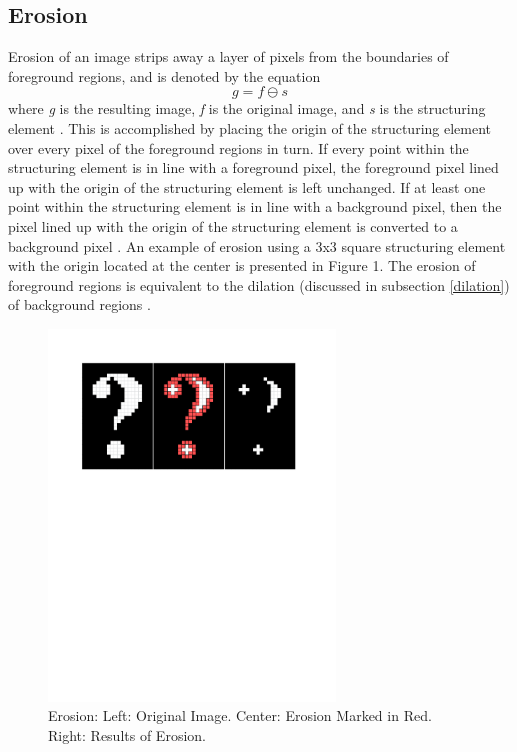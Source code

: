 \documentclass{sig-alternate}
\begin{document}
\subsection{Erosion}\label{erosion}
Erosion of an image strips away a layer of pixels from the boundaries of foreground regions, and is denoted by the equation
\begin{equation*}
g = f \ominus s
\end{equation*}
where \textit{g} is the resulting image, \textit{f} is the original image, and \textit{s} is the structuring element \cite{MorphologyWikiAnonymous, MorphologyBook:2000}. This is accomplished by placing the origin of the structuring element over every pixel of the foreground regions in turn. If every point within the structuring element is in line with a foreground pixel, the foreground pixel lined up with the origin of the structuring element is left unchanged. If at least one point within the structuring element is in line with a background pixel, then the pixel lined up with the origin of the structuring element is converted to a background pixel \cite{MorphologyWiki}. An example of erosion using a 3x3 square structuring element with the origin located at the center is presented in Figure 1. The erosion of foreground regions is equivalent to the dilation (discussed in subsection \ref{dilation}) of background regions \cite{MorphologyWiki}.
\begin{figure}
\centering
\includegraphics[width=3in,trim={0 6.75in 0 0},clip]{erosion}
\caption{Erosion: Left: Original Image. Center: Erosion Marked in Red. Right: Results of Erosion.}
\end{figure}
\end{document}
